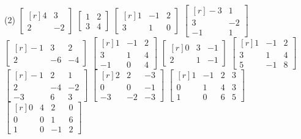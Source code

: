 \begin{tasks}[
    start=55,
    style=enumerate,
    label-offset = 3mm,
    ](2)
    \task $\begin{bmatrix*}[r]4 & 3 \\ 2 & -2\end{bmatrix*}$
    \task $\begin{bmatrix*}1 & 2 \\ 3 & 4\end{bmatrix*}$
    \task $\begin{bmatrix*}[r]1 & -1 & 2 \\ 3 & 1 & 0\end{bmatrix*}$
    \task $\begin{bmatrix*}[r]-3 & 1 \\ 3 & -2 \\ -1 & 1\end{bmatrix*}$
    \task $\begin{bmatrix*}[r]-1 & 3 & 2 \\ 2 & -6 & -4\end{bmatrix*}$
    \task $\begin{bmatrix*}[r]1 & -1 & 2 \\ 3 & 1 & 4 \\ -1 & 0 & 4\end{bmatrix*}$
    \task $\begin{bmatrix*}[r]0 & 3 & -1 \\ 2 & 1 & -1\end{bmatrix*}$
    \task $\begin{bmatrix*}[r]1 & -1 & 2 \\ 3 & 1 & 4 \\ 5 & -1 & 8\end{bmatrix*}$
    \task $\begin{bmatrix*}[r]-1 & 2 & 1 \\ 2 & -4 & -2 \\ -3 & 6 & 3\end{bmatrix*}$
    \task $\begin{bmatrix*}[r]2 & 2 & -3 \\ 0 & 0 & -1 \\ -3 & -2 & -3\end{bmatrix*}$
    \task $\begin{bmatrix*}[r]1 & -1 & 2 & 3 \\ 0 & 1 & 4 & 3 \\ 1 & 0 & 6 & 5\end{bmatrix*}$
    \task $\begin{bmatrix*}[r]0 & 4 & 2 & 0 \\ 0 & 0 & 1 & 6 \\ 1 & 0 & -1 & 2\end{bmatrix*}$

\end{tasks}
